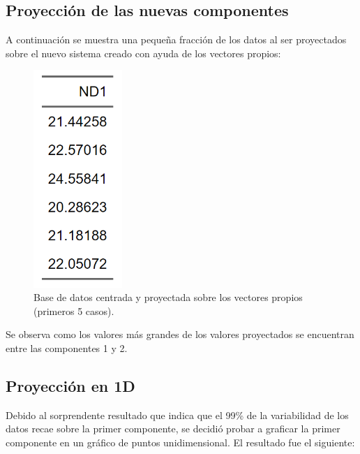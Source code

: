 \documentclass[11pt, letterpaper]{article}
\begin{document}
\newpage

\subsection{Proyección de las nuevas componentes}

A continuación se muestra una pequeña fracción de los datos al ser proyectados sobre el nuevo sistema creado con ayuda de los vectores propios:

\begin{figure}[h!]
	\centering
	\begin{minipage}{0.8\textwidth}
		\centering
		\includegraphics[width=0.3\textwidth]{IMG/T2.png}
		\caption{Base de datos centrada y proyectada sobre los vectores propios (primeros 5 casos).}
		\label{fig:f6}
	\end{minipage}\hfill
\end{figure}

Se observa como los valores más grandes de los valores proyectados se encuentran entre las componentes 1 y 2.

\newpage

\subsection{Proyección en 1D}

Debido al sorprendente resultado que indica que el 99\% de la variabilidad de los datos recae sobre la primer componente, se decidió probar a graficar la primer componente en un gráfico de puntos unidimensional. El resultado fue el siguiente:
\end{document}
